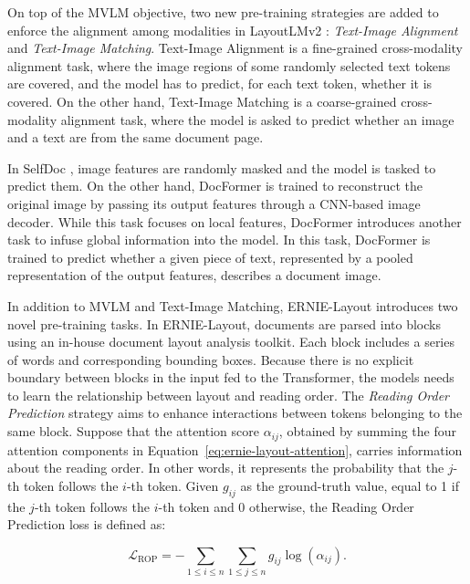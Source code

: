 On top of the \ac{MVLM} objective, two new pre-training strategies are added to enforce the alignment among modalities in LayoutLMv2 \citep{xu2020layoutlmv2}: \textit{Text-Image Alignment} and \textit{Text-Image Matching}. Text-Image Alignment is a fine-grained cross-modality alignment task, where the image regions of some randomly selected text tokens are covered, and the model has to predict, for each text token, whether it is covered. On the other hand, Text-Image Matching is a coarse-grained cross-modality alignment task, where the model is asked to predict whether an image and a text are from the same document page. 

In SelfDoc \citep{li2021selfdoc}, image features are randomly masked and the model is tasked to predict them. On the other hand, DocFormer \citep{appalaraju2021docformer} is trained to reconstruct the original image by passing its output features through a \ac{CNN}-based image decoder. While this task focuses on local features, DocFormer introduces another task to infuse global information into the model. In this task, DocFormer is trained to predict whether a given piece of text, represented by a pooled representation of the output features, describes a document image. 

In addition to \ac{MVLM} and Text-Image Matching, ERNIE-Layout  \citep{peng2022ernie} introduces two novel pre-training tasks. In ERNIE-Layout, documents are parsed into blocks using an in-house document layout analysis toolkit. Each block includes a series of words and corresponding bounding boxes. Because there is no explicit boundary between blocks in the input fed to the Transformer, the models needs to learn the relationship between layout and reading order. The \textit{Reading Order Prediction} strategy aims to enhance interactions between tokens belonging to the same block. Suppose that the attention score $\alpha_{ij}$, obtained by summing the four attention components in Equation~\ref{eq:ernie-layout-attention}, carries information about the reading order. In other words, it represents the probability that the $j$-th token follows the $i$-th token. Given $g_{ij}$ as the ground-truth value, equal to 1 if the $j$-th token follows the $i$-th token and 0 otherwise, the Reading Order Prediction loss is defined as:

\begin{equation}
    \mathcal{L}_{\text{ROP}} = - \sum_{1 \leq i \leq n}\sum_{1 \leq j \leq n} g_{ij} \log(\alpha_{ij}).
\end{equation}

